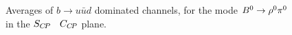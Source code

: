 \begin{figure}[htb]
  \begin{center}
  \end{center}
  \vspace{-0.8cm}
  \caption{
    Averages of $b \to u\bar u d$ dominated channels,
    for the mode $B^0 \to \rho^0\pi^0$
    in the $S_{C\!P}$ \vs\ $C_{C\!P}$ plane.
  }
  \label{fig:cp_uta:uud:rho0pi0_SvsC}
\end{figure}

